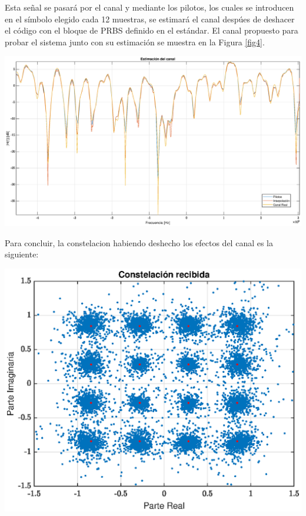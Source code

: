 \documentclass[11pt]{scrartcl} %
\begin{document}
\begin{preview}
Esta señal se pasará por el canal y mediante los pilotos, los cuales se introducen en el símbolo elegido cada 12 muestras, se estimará el canal despúes de deshacer el código con el bloque de PRBS definido en el estándar. El canal propuesto para probar el sistema junto con su estimación se muestra en la Figura \ref{fig4}.

\begin{minipage}{\linewidth}
	\begin{center}
		\includegraphics[width=1\columnwidth,trim={0 0 1cm 0},clip]{../../Matlab/Figures/canalestimado.eps} %
	\end{center}
	\label{fig4}
\end{minipage}

Para concluir, la constelacion habiendo deshecho los efectos del canal es la siguiente:

\begin{minipage}{\linewidth}
	\begin{center}
		\includegraphics[width=1\columnwidth,trim={0 0 1cm 0},clip]{../../Matlab/Figures/constRX.eps} %
	\end{center}
	\label{fig5}
\end{minipage}


\end{preview}
\end{document}
